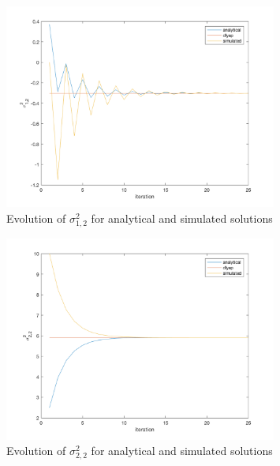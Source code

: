 \documentclass[11pt]{article}
\begin{document}
\begin{figure}[h]
	\centering
	\includegraphics[width=0.8\textwidth]{prob4e_plt2.png}
	\caption{Evolution of $\sigma_{1,2}^2$ for analytical and simulated solutions}
	\label{sig12}
\end{figure}

\begin{figure}[h]
	\centering
	\includegraphics[width=0.8\textwidth]{prob4e_plt3.png}
	\caption{Evolution of $\sigma_{2,2}^2$ for analytical and simulated solutions}
	\label{sig22}
\end{figure}
\end{document}
